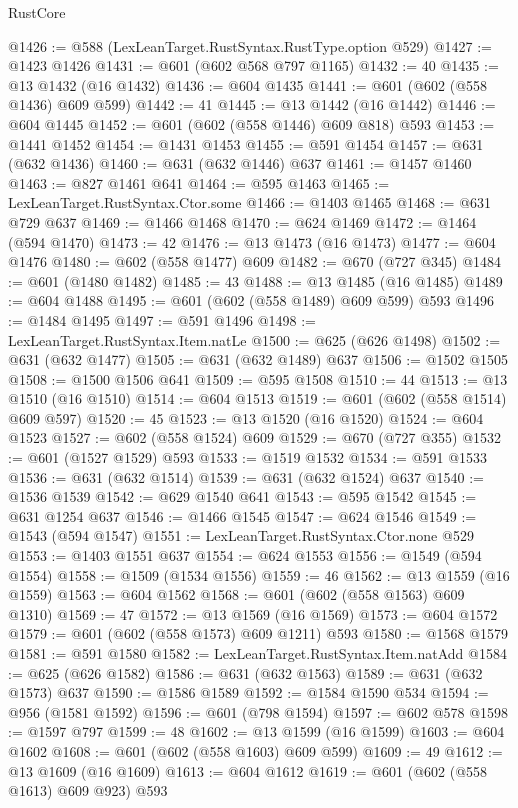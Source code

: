 \begin{lexlean}{RustCore}
\begin{coremodule}
@1426 := @588 (LexLeanTarget.RustSyntax.RustType.option @529)
@1427 := @1423 @1426
@1431 := @601 (@602 @568 @797 @1165)
@1432 := 40
@1435 := @13 @1432 (@16 @1432)
@1436 := @604 @1435
@1441 := @601 (@602 (@558 @1436) @609 @599)
@1442 := 41
@1445 := @13 @1442 (@16 @1442)
@1446 := @604 @1445
@1452 := @601 (@602 (@558 @1446) @609 @818) @593
@1453 := @1441 @1452
@1454 := @1431 @1453
@1455 := @591 @1454
@1457 := @631 (@632 @1436)
@1460 := @631 (@632 @1446) @637
@1461 := @1457 @1460
@1463 := @827 @1461 @641
@1464 := @595 @1463
@1465 := LexLeanTarget.RustSyntax.Ctor.some
@1466 := @1403 @1465
@1468 := @631 @729 @637
@1469 := @1466 @1468
@1470 := @624 @1469
@1472 := @1464 (@594 @1470)
@1473 := 42
@1476 := @13 @1473 (@16 @1473)
@1477 := @604 @1476
@1480 := @602 (@558 @1477) @609
@1482 := @670 (@727 @345)
@1484 := @601 (@1480 @1482)
@1485 := 43
@1488 := @13 @1485 (@16 @1485)
@1489 := @604 @1488
@1495 := @601 (@602 (@558 @1489) @609 @599) @593
@1496 := @1484 @1495
@1497 := @591 @1496
@1498 := LexLeanTarget.RustSyntax.Item.natLe
@1500 := @625 (@626 @1498)
@1502 := @631 (@632 @1477)
@1505 := @631 (@632 @1489) @637
@1506 := @1502 @1505
@1508 := @1500 @1506 @641
@1509 := @595 @1508
@1510 := 44
@1513 := @13 @1510 (@16 @1510)
@1514 := @604 @1513
@1519 := @601 (@602 (@558 @1514) @609 @597)
@1520 := 45
@1523 := @13 @1520 (@16 @1520)
@1524 := @604 @1523
@1527 := @602 (@558 @1524) @609
@1529 := @670 (@727 @355)
@1532 := @601 (@1527 @1529) @593
@1533 := @1519 @1532
@1534 := @591 @1533
@1536 := @631 (@632 @1514)
@1539 := @631 (@632 @1524) @637
@1540 := @1536 @1539
@1542 := @629 @1540 @641
@1543 := @595 @1542
@1545 := @631 @1254 @637
@1546 := @1466 @1545
@1547 := @624 @1546
@1549 := @1543 (@594 @1547)
@1551 := LexLeanTarget.RustSyntax.Ctor.none @529
@1553 := @1403 @1551 @637
@1554 := @624 @1553
@1556 := @1549 (@594 @1554)
@1558 := @1509 (@1534 @1556)
@1559 := 46
@1562 := @13 @1559 (@16 @1559)
@1563 := @604 @1562
@1568 := @601 (@602 (@558 @1563) @609 @1310)
@1569 := 47
@1572 := @13 @1569 (@16 @1569)
@1573 := @604 @1572
@1579 := @601 (@602 (@558 @1573) @609 @1211) @593
@1580 := @1568 @1579
@1581 := @591 @1580
@1582 := LexLeanTarget.RustSyntax.Item.natAdd
@1584 := @625 (@626 @1582)
@1586 := @631 (@632 @1563)
@1589 := @631 (@632 @1573) @637
@1590 := @1586 @1589
@1592 := @1584 @1590 @534
@1594 := @956 (@1581 @1592)
@1596 := @601 (@798 @1594)
@1597 := @602 @578
@1598 := @1597 @797
@1599 := 48
@1602 := @13 @1599 (@16 @1599)
@1603 := @604 @1602
@1608 := @601 (@602 (@558 @1603) @609 @599)
@1609 := 49
@1612 := @13 @1609 (@16 @1609)
@1613 := @604 @1612
@1619 := @601 (@602 (@558 @1613) @609 @923) @593

\end{coremodule}
\end{lexlean}
